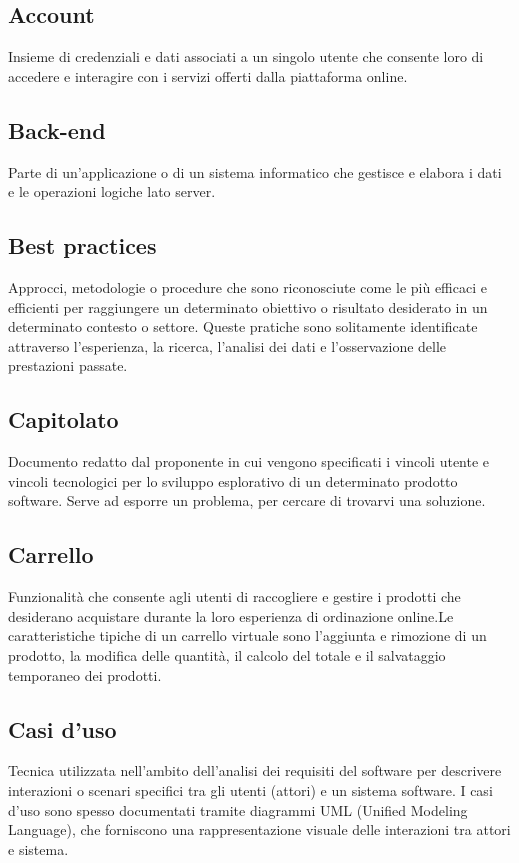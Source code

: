 \subsection{Account}Insieme di credenziali e dati associati a un singolo utente che consente loro di accedere e interagire con i servizi offerti dalla piattaforma online.
\subsection{Back-end}Parte di un'applicazione o di un sistema informatico che gestisce e elabora i dati e le operazioni logiche lato server.
\subsection{Best practices}Approcci, metodologie o procedure che sono riconosciute come le più efficaci e efficienti per raggiungere un determinato obiettivo o risultato desiderato in un determinato contesto o settore. Queste pratiche sono solitamente identificate attraverso l'esperienza, la ricerca, l'analisi dei dati e l'osservazione delle prestazioni passate.
\subsection{Capitolato}Documento redatto dal proponente in cui vengono specificati i vincoli utente e vincoli tecnologici per lo sviluppo esplorativo di un determinato prodotto software. Serve ad esporre un problema, per cercare di trovarvi una soluzione.
\subsection{Carrello}Funzionalità che consente agli utenti di raccogliere e gestire i prodotti che desiderano acquistare durante la loro esperienza di ordinazione online.Le caratteristiche tipiche di un carrello virtuale sono l'aggiunta e rimozione di un prodotto, la modifica delle quantità, il calcolo del totale e il salvataggio temporaneo dei prodotti.
\subsection{Casi d’uso}Tecnica utilizzata nell'ambito dell'analisi dei requisiti del software per descrivere interazioni o scenari specifici tra gli utenti (attori) e un sistema software. I casi d'uso sono spesso documentati tramite diagrammi UML (Unified Modeling Language), che forniscono una rappresentazione visuale delle interazioni tra attori e sistema.
